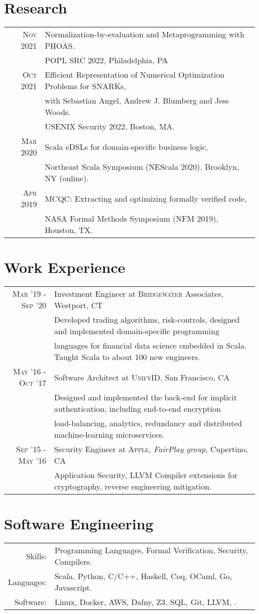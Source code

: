 \documentclass[lettersize,11pt]{article}
\begin{document}
\section{Research}
\begin{tabular}{rl}
    \textsc{Nov} 2021 & Normalization-by-evaluation and Metaprogramming with PHOAS.\\
                      & POPL SRC 2022, Philadelphia, PA  \\[0.5em]
    \textsc{Oct} 2021 & Efficient Representation of Numerical Optimization Problems for SNARKs, \\
                      & with Sebastian Angel, Andrew J. Blumberg and Jess Woods. \\
                      & USENIX Security 2022, Boston, MA.  \\[0.5em]
    \textsc{Mar} 2020 & Scala eDSLs for domain-specific business logic, \\
                      & Northeast Scala Symposium (NEScala 2020), Brooklyn, NY (online). \\[0.5em]
    \textsc{Apr} 2019 & MCQC: Extracting and optimizing formally verified code, \\
                      & NASA Formal Methods Symposium (NFM 2019), Houston, TX. \\
\end{tabular}

\section{Work Experience}
\begin{tabular}{rl}
\textsc{Mar} '19 - \textsc{Sep} '20 & Investment Engineer at \textsc{Bridgewater} Associates, Westport, CT\\
&\footnotesize{Developed trading algorithms, risk-controls, designed and implemented domain-specific programming}\\
&\footnotesize{languages for financial data science embedded in Scala. Taught Scala to about 100 new engineers.}\\[0.5em]
\textsc{May} '16 - \textsc{Oct} '17 & Software Architect at \textsc{UnifyID}, San Francisco, CA\\
&\footnotesize{Designed and implemented the back-end for implicit authentication, including end-to-end encryption}\\
&\footnotesize{load-balancing, analytics, redundancy and distributed machine-learning microservices.}\\[0.5em]
\textsc{Sep} '15 - \textsc{May} '16 & Security Engineer at \textsc{Apple}, \emph{FairPlay group}, Cupertino, CA \\
&\footnotesize{Application Security, LLVM Compiler extensions for cryptography, reverse engineering mitigation.}\\[0.5em]
\end{tabular}

\section{Software Engineering}
\begin{tabular}{rl}
Skills:& Programming Languages, Formal Verification, Security, Compilers. \\
Languages: & Scala, Python, C/C++, Haskell, Coq, OCaml, Go, Javascript. \\
Software:& Linux, Docker, AWS, Dafny, Z3, SQL, Git, LLVM, . \\
\end{tabular}
\end{document}
